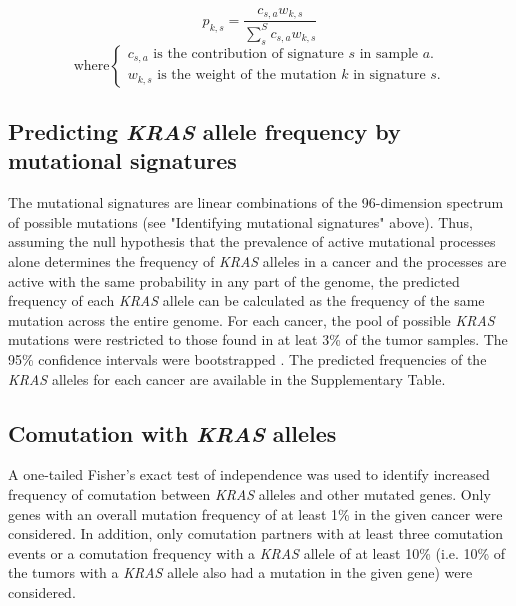 \documentclass[english, 10pt, letterpaper]{article}
\newcommand{\KRAS}{\emph{KRAS}}
\begin{document}
\begin{equation}
\label{eq:kras_mutation_from_signature}
p_{k,s} = \frac{c_{s,a} w_{k,s}}{\sum_{s}^{S} c_{s,a} w_{k,s}}
\end{equation}
\begin{equation*}
    \text{where} 
    \begin{cases}
        c_{s,a} \text{ is the contribution of signature $s$ in sample $a$.} \\
        w_{k,s} \text{ is the weight of the mutation $k$ in signature $s$.}
    \end{cases}
\end{equation*}


\subsection*{Predicting \KRAS{} allele frequency by mutational signatures}

The mutational signatures are linear combinations of the 96-dimension spectrum of possible mutations (see "Identifying mutational signatures" above).
Thus, assuming the null hypothesis that the prevalence of active mutational processes alone determines the frequency of \KRAS{} alleles in a cancer and the processes are active with the same probability in any part of the genome, the predicted frequency of each \KRAS{} allele can be calculated as the frequency of the same mutation across the entire genome.
For each cancer, the pool of possible \KRAS{} mutations were restricted to those found in at leat 3\% of the tumor samples.
The 95\% confidence intervals were bootstrapped \cite{R-boot}.
The predicted frequencies of the \KRAS{} alleles for each cancer are available in the Supplementary Table.


\subsection*{Comutation with \KRAS{} alleles}

A one-tailed Fisher’s exact test of independence was used to identify increased frequency of comutation between \KRAS{} alleles and other mutated genes.
Only genes with an overall mutation frequency of at least 1\% in the given cancer were considered.
In addition, only comutation partners with at least three comutation events or a comutation frequency with a \KRAS{} allele of at least 10\% (i.e. 10\% of the tumors with a \KRAS{} allele also had a mutation in the given gene) were considered.
\end{document}
